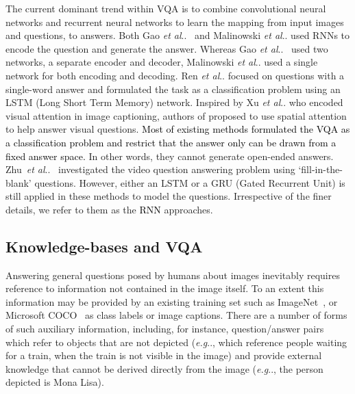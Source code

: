 \documentclass[10pt,journal]{IEEEtran}
\makeatletter
\DeclareRobustCommand\onedot{\futurelet\@let@token\@onedot}
\def\@onedot{\ifx\@let@token.\else.\null\fi\xspace}
\def\eg{\emph{e.g}\onedot} \def\Eg{\emph{E.g}\onedot}
\def\etal{\emph{et al}\onedot}
\def\bluettt{\textcolor{black}}
\makeatother
\begin{document}
The current dominant trend within VQA is to combine convolutional neural networks and recurrent neural networks to learn the mapping from input images and questions, to answers. Both Gao \etal~\cite{gao2015you} and Malinowski \etal \cite{malinowski2015ask} used RNNs to encode the question and generate the answer.  Whereas Gao \etal~\cite{gao2015you} used two networks, a separate encoder and decoder, Malinowski \etal \cite{malinowski2015ask} used a single network for both encoding and decoding. Ren \etal \cite{ren2015image} focused on questions with a single-word answer and formulated the task as a classification problem using an LSTM (Long Short Term Memory) network. Inspired by Xu \etal \cite{xu2015show} who encoded visual attention in image captioning, authors of \cite{zhu2015visual7w,Chen2015ABC,Jiang2015compositional,andreas2015deep,yang2015stacked} proposed to use spatial attention to help answer visual questions. 
\bluettt{Most of existing methods formulated the VQA as a classification problem and restrict that the answer only can be drawn from a fixed answer space.} 
In other words, they cannot generate open-ended answers. 
Zhu~\etal~\cite{zhu2015uncovering} investigated the video question answering problem using `fill-in-the-blank' questions. However, either an LSTM or a GRU (Gated Recurrent Unit) is still applied in these methods to model the questions. Irrespective of the finer details, we refer to them as the \bluettt{RNN} approaches.

\subsection{Knowledge-bases and VQA}

Answering general questions posed by humans about images inevitably requires reference to information not contained in the image itself. To an extent this information may be provided by an existing training set such as ImageNet~\cite{deng2009imagenet}, or Microsoft COCO~\cite{lin2014microsoft} as class labels or image captions.
There are a number of forms of such auxiliary information, including, for instance, question/answer pairs
which refer to objects that are not depicted (\eg, which reference people waiting for a train, when the train is not visible in the image) and provide external knowledge that cannot be derived directly from the image (\eg, the person depicted is Mona Lisa).
\end{document}
